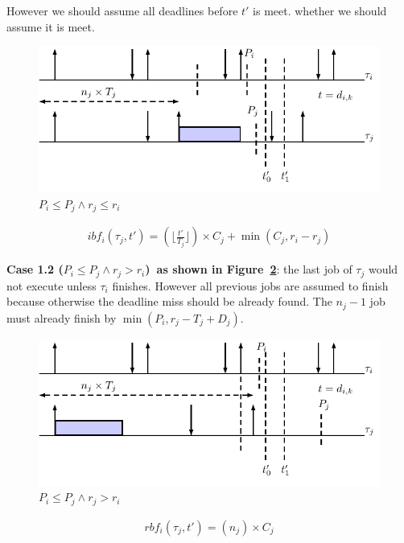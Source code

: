 \documentclass[12pt,conference,twocolumn]{IEEEtran}
\begin{document}
However we should assume all deadlines before $t'$ is meet. whether we should assume it is meet.
	\begin{figure}[h!]
 \centering
\includegraphics[scale=0.7]{Figure/C3}  
\caption{$P_i\leq P_j\wedge r_j\leq r_i$}
  \label{fig:case3}
\end{figure}
		\begin{align*}
		ibf_i(\tau_j,t')=(\lfloor \frac{t'}{T_j} \rfloor)\times C_j+\min(C_j,r_i-r_j)
	\end{align*}


\textbf{Case 1.2 ($P_i\leq P_j\wedge r_j> r_i$)~as shown in  Figure~\ref{fig:case4}}:  the last job of $\tau_j$ would not execute unless $\tau_i$ finishes. However all previous jobs are assumed to finish because otherwise the deadline miss should be already found. The $n_j-1$ job must already finish by $\min(P_i,r_j-T_j+D_j)$.

	\begin{figure}[h!]
 \centering
\includegraphics[scale=0.7]{Figure/C31}  
\caption{$P_i\leq P_j\wedge r_j> r_i$}
  \label{fig:case4}
\end{figure}

	\begin{align*}
		rbf_i(\tau_j,t')=(n_j)\times C_j
	\end{align*}
\end{document}
